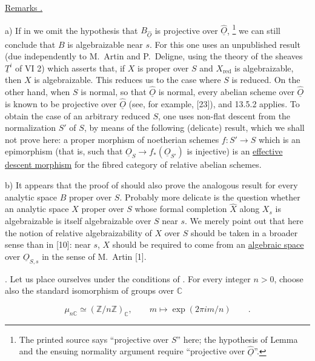 \medskip
\noindent
\underline{Remarks .}

\smallskip
\noindent
a) If in  we omit the hypothesis that
$B_{\hat{\underline O}}$ is projective over $\hat{\underline O}$,
\footnote{The printed source says ``projective over $S$'' here; the
hypothesis of Lemma  and the ensuing normality argument require
``projective over $\hat{\underline O}$''.}
we can still conclude that $B$ is algebraizable near $s$.  For this one
uses an unpublished result (due independently to M.~Artin and
P.~Deligne, using the theory of the sheaves $\underline T^i$ of VI 2)
which asserts that, if $X$ is proper over $S$ and $X_{\mathrm{red}}$ is
algebraizable, then $X$ is algebraizable.  This reduces us to the case
where $S$ is reduced.  On the other hand, when $S$ is normal, so that
$\hat{\underline O}$ is normal, every abelian scheme over
$\hat{\underline O}$ is known to be projective over
$\hat{\underline O}$ (see, for example, [23]), and 13.5.2 applies.  To
obtain the case of an arbitrary reduced $S$, one uses non-flat descent
from the normalization $S'$ of $S$, by means of the following
(delicate) result, which we shall not prove here: a proper morphism of
noetherian schemes $f:S'\longrightarrow S$ which is an epimorphism
(that is, such that
$\underline O_S\longrightarrow f_*(\underline O_{S'})$ is injective)
is an \underline{effective descent morphism} for the fibred category of
relative abelian schemes.

\smallskip
\noindent
b) It appears that the proof of  should also prove the analogous
result for every analytic space $B$ proper over $S$.  Probably more
delicate is the question whether an analytic space $X$ proper over $S$
whose formal completion $\hat X$ along $X_s$ is algebraizable is itself
algebraizable over $S$ near $s$.  We merely point out that here the
notion of relative algebraizability of $X$ over $S$ should be taken in
a broader sense than in [10]: near $s$, $X$ should be required to come
from an \underline{algebraic space} over $\underline O_{S,s}$ in the
sense of M.~Artin [1].

\medskip
\noindent
{}. Let us place ourselves under the conditions of .  For
every integer $n>0$, choose also the standard isomorphism of groups over
$\mathbb C$

\begin{equation*}
 \mu_{n\mathbb C}\simeq(\mathbb Z/n\mathbb Z)_{\mathbb C},
 \qquad m\longmapsto\exp(2\pi i m/n)\qquad .
\end{equation*}

